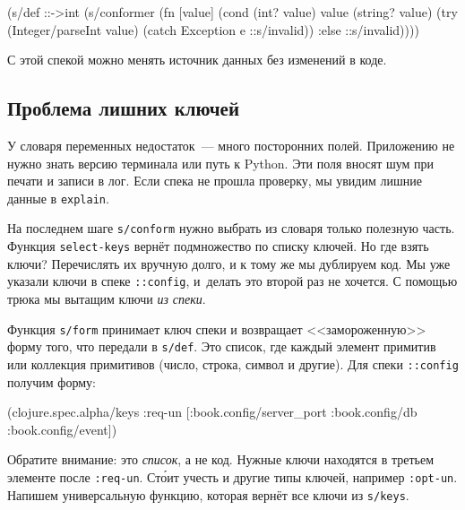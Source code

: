 \begin{english}
  \begin{clojure}
(s/def ::->int
  (s/conformer
   (fn [value]
     (cond
       (int? value) value
       (string? value)
       (try (Integer/parseInt value)
            (catch Exception e
              ::s/invalid))
       :else ::s/invalid))))
  \end{clojure}
\end{english}

\noindent
С этой спекой можно менять источник данных без изменений в коде.

\subsection{Проблема лишних ключей}

У словаря переменных недостаток~--- много посторонних полей. Приложению не нужно
знать версию терминала или путь к Python. Эти поля вносят шум при печати и
записи в лог. Если спека не прошла проверку, мы увидим лишние данные в
\verb|explain|.


На последнем шаге \verb|s/conform| нужно выбрать из словаря только полезную
часть. Функция \verb|select-keys| вернёт подмножество по списку ключей. Но где
взять ключи? Перечислять их вручную долго, и к тому же мы дублируем код. Мы уже
указали ключи в спеке \verb|::config|, и~делать это второй раз не хочется. С
помощью трюка мы вытащим ключи \emph{из спеки}.

Функция \verb|s/form| принимает ключ спеки и возвращает <<замороженную>> форму
того, что передали в \verb|s/def|. Это список, где каждый элемент примитив или
коллекция примитивов (число, строка, символ и другие). Для спеки \verb|::config|
получим форму:

\begin{english}
  \begin{clojure}
(clojure.spec.alpha/keys
 :req-un [:book.config/server_port
          :book.config/db
          :book.config/event])
  \end{clojure}
\end{english}


Обратите внимание: это \emph{список}, а не код. Нужные ключи находятся в третьем
элементе после \verb|:req-un|. Ст\'{о}ит учесть и другие типы ключей, например
\verb|:opt-un|. Напишем универсальную функцию, которая вернёт все ключи из
\verb|s/keys|.

